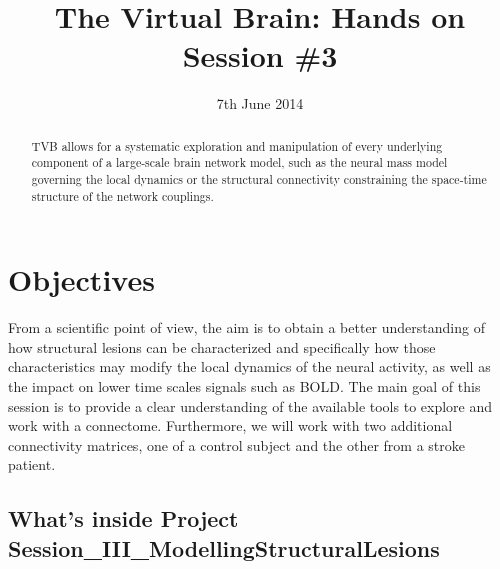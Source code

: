 \documentclass{tufte-handout}
\title{The Virtual Brain: Hands on Session \#3}
\date{7th June 2014}
\begin{document}

\newpage
\ClearWallPaper
\begin{abstract}
\noindent TVB allows for a systematic exploration and manipulation of every
underlying component of a large-scale brain network model, such as the neural
mass model governing the local dynamics  or the structural connectivity
constraining the space-time structure of the network couplings.
\begin{marginfigure}%
  \label{fig:marginfig}
\end{marginfigure}
\end{abstract}


\section{Objectives}\label{sec:objectives}

From a scientific point of view, the aim is to obtain a better understanding of
how structural lesions can be characterized and specifically how those
characteristics may modify the local dynamics of the neural activity, as well
as the impact on lower time scales signals such as BOLD. The main goal of this
session is to provide a clear understanding of the available tools to explore
and work with a connectome. Furthermore, we will work with two additional
connectivity matrices, one of a control subject and the other from a stroke
patient.


\subsection{What's inside Project Session\_III\_ModellingStructuralLesions}\label{sec:project_data}
\end{document}
